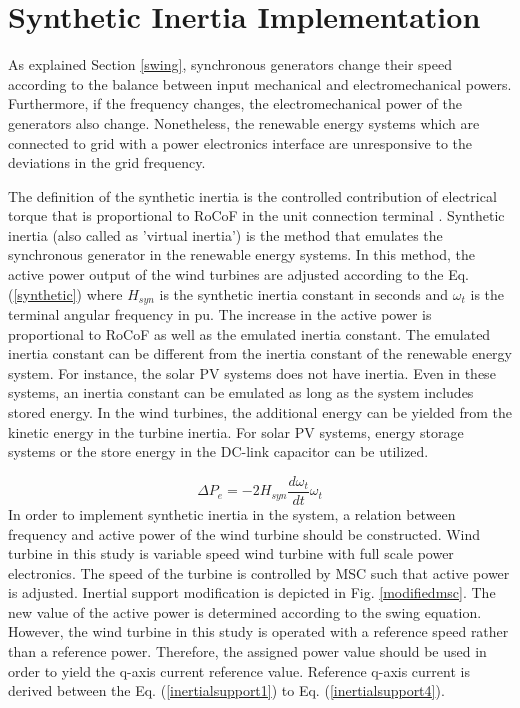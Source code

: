 \section{Synthetic Inertia Implementation}
As explained Section \ref{swing}, synchronous generators change their speed according to the balance between input mechanical and electromechanical powers. Furthermore, if the frequency changes, the electromechanical power of the generators also change. Nonetheless, the renewable energy systems which are connected to grid with a power electronics interface are unresponsive to the deviations in the grid frequency.\par
The definition of the synthetic inertia is the controlled contribution of electrical torque that is proportional to RoCoF in the unit connection terminal \cite{Eriksson2017}. Synthetic inertia (also called as 'virtual inertia') is the method that emulates the synchronous generator in the renewable energy systems. In this method, the active power output of the wind turbines are adjusted according to the Eq. (\ref{synthetic}) where $H_{syn}$ is the synthetic inertia constant in seconds and $\omega_{t}$ is the terminal angular frequency in pu. The increase in the active power is proportional to RoCoF as well as the emulated inertia constant. The emulated inertia constant can be different from the inertia constant of the renewable energy system. For instance, the solar PV systems does not have inertia. Even in these systems, an inertia constant can be emulated as long as the system includes stored energy. In the wind turbines, the additional energy can be yielded from the kinetic energy in the turbine inertia. For solar PV systems, energy storage systems or the store energy in the DC-link capacitor can be utilized.\par
\begin{equation}
\Delta P_{e}=-2H_{syn}\frac{d\omega_{t}}{dt}\omega_{t}
\label{synthetic}
\end{equation}
In order to implement synthetic inertia in the system, a relation between frequency and active power of the wind turbine should be constructed. Wind turbine in this study is variable speed wind turbine with full scale power electronics. The speed of the turbine is controlled by MSC such that active power is adjusted. Inertial support modification is depicted in Fig. \ref{modifiedmsc}. The new value of the active power is determined according to the swing equation. However, the wind turbine in this study is operated with a reference speed rather than a reference power. Therefore, the assigned power value should be used in order to yield the q-axis current reference value. Reference q-axis current is derived between the Eq. (\ref{inertialsupport1}) to Eq. (\ref{inertialsupport4}).\par

